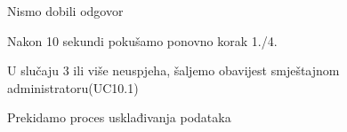 \begin{packed_item}
\begin{packed_item}
\begin{packed_enum}
							\end{packed_enum}
							
							\item[2.a i 5.a] Nismo dobili odgovor 
							\item[] \begin{packed_enum}
								
								\item Nakon 10 sekundi pokušamo ponovno korak 1./4.
								\item U slučaju 3 ili više neuspjeha, šaljemo obavijest smještajnom administratoru(UC10.1)
								\item Prekidamo proces usklađivanja podataka
								
							\end{packed_enum}
							
						\end{packed_item}
					\end{packed_item}
					
